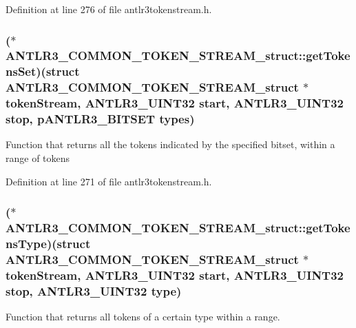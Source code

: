 Definition at line 276 of file antlr3tokenstream.\-h.

\hypertarget{struct_a_n_t_l_r3___c_o_m_m_o_n___t_o_k_e_n___s_t_r_e_a_m__struct_ad9165a26655f08efe2ebd812e59779e1}{
\subsubsection[{get\-Tokens\-Set}]{($\ast$ A\-N\-T\-L\-R3\-\_\-\-C\-O\-M\-M\-O\-N\-\_\-\-T\-O\-K\-E\-N\-\_\-\-S\-T\-R\-E\-A\-M\-\_\-struct\-::get\-Tokens\-Set)(struct {\bf A\-N\-T\-L\-R3\-\_\-\-C\-O\-M\-M\-O\-N\-\_\-\-T\-O\-K\-E\-N\-\_\-\-S\-T\-R\-E\-A\-M\-\_\-struct} $\ast$token\-Stream, {\bf A\-N\-T\-L\-R3\-\_\-\-U\-I\-N\-T32} start, {\bf A\-N\-T\-L\-R3\-\_\-\-U\-I\-N\-T32} stop, {\bf p\-A\-N\-T\-L\-R3\-\_\-\-B\-I\-T\-S\-E\-T} types)}}\label{struct_a_n_t_l_r3___c_o_m_m_o_n___t_o_k_e_n___s_t_r_e_a_m__struct_ad9165a26655f08efe2ebd812e59779e1}
Function that returns all the tokens indicated by the specified bitset, within a range of tokens 

Definition at line 271 of file antlr3tokenstream.\-h.

\hypertarget{struct_a_n_t_l_r3___c_o_m_m_o_n___t_o_k_e_n___s_t_r_e_a_m__struct_a530543c21759c2e6f1fd0283a7d52671}{
\subsubsection[{get\-Tokens\-Type}]{($\ast$ A\-N\-T\-L\-R3\-\_\-\-C\-O\-M\-M\-O\-N\-\_\-\-T\-O\-K\-E\-N\-\_\-\-S\-T\-R\-E\-A\-M\-\_\-struct\-::get\-Tokens\-Type)(struct {\bf A\-N\-T\-L\-R3\-\_\-\-C\-O\-M\-M\-O\-N\-\_\-\-T\-O\-K\-E\-N\-\_\-\-S\-T\-R\-E\-A\-M\-\_\-struct} $\ast$token\-Stream, {\bf A\-N\-T\-L\-R3\-\_\-\-U\-I\-N\-T32} start, {\bf A\-N\-T\-L\-R3\-\_\-\-U\-I\-N\-T32} stop, {\bf A\-N\-T\-L\-R3\-\_\-\-U\-I\-N\-T32} {\bf type})}}\label{struct_a_n_t_l_r3___c_o_m_m_o_n___t_o_k_e_n___s_t_r_e_a_m__struct_a530543c21759c2e6f1fd0283a7d52671}
Function that returns all tokens of a certain type within a range. 

